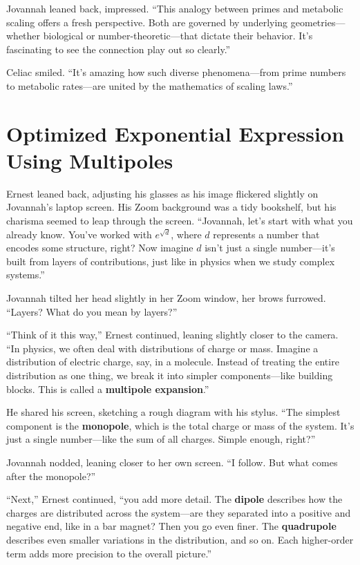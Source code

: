 Jovannah leaned back, impressed. “This analogy between primes and metabolic scaling offers a fresh perspective. Both are governed by underlying geometries—whether biological or number-theoretic—that dictate their behavior. It’s fascinating to see the connection play out so clearly.”

Celiac smiled. “It’s amazing how such diverse phenomena—from prime numbers to metabolic rates—are united by the mathematics of scaling laws.”
\newpage


\section*{Optimized Exponential Expression Using Multipoles}

Ernest leaned back, adjusting his glasses as his image flickered slightly on Jovannah’s laptop screen. His Zoom background was a tidy bookshelf, but his charisma seemed to leap through the screen. “Jovannah, let’s start with what you already know. You’ve worked with \(e^{\sqrt{d}}\), where \(d\) represents a number that encodes some structure, right? Now imagine \(d\) isn’t just a single number—it’s built from layers of contributions, just like in physics when we study complex systems.”

Jovannah tilted her head slightly in her Zoom window, her brows furrowed. “Layers? What do you mean by layers?”

“Think of it this way,” Ernest continued, leaning slightly closer to the camera. “In physics, we often deal with distributions of charge or mass. Imagine a distribution of electric charge, say, in a molecule. Instead of treating the entire distribution as one thing, we break it into simpler components—like building blocks. This is called a \textbf{multipole expansion}.”

He shared his screen, sketching a rough diagram with his stylus. “The simplest component is the \textbf{monopole}, which is the total charge or mass of the system. It’s just a single number—like the sum of all charges. Simple enough, right?”

Jovannah nodded, leaning closer to her own screen. “I follow. But what comes after the monopole?”

“Next,” Ernest continued, “you add more detail. The \textbf{dipole} describes how the charges are distributed across the system—are they separated into a positive and negative end, like in a bar magnet? Then you go even finer. The \textbf{quadrupole} describes even smaller variations in the distribution, and so on. Each higher-order term adds more precision to the overall picture.”

